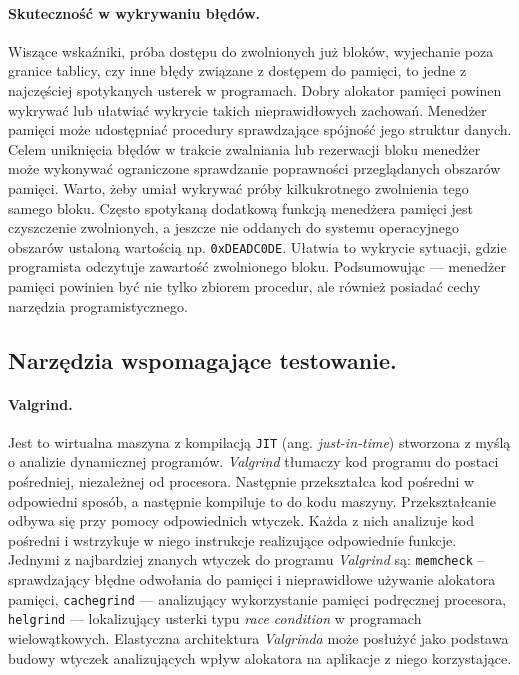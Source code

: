 \documentclass[12pt,a4paper,titlepage,twoside]{mwart}
\begin{document}
\paragraph{Skuteczność w wykrywaniu błędów.} Wiszące wskaźniki, próba dostępu
do zwolnionych już bloków, wyjechanie poza granice tablicy, czy inne błędy
związane z dostępem do pamięci, to jedne z najczęściej spotykanych usterek w
programach. Dobry alokator pamięci powinen wykrywać lub ułatwiać wykrycie
takich nieprawidłowych zachowań. Menedżer pamięci może udostępniać procedury
sprawdzające spójność jego struktur danych. Celem uniknięcia błędów w trakcie
zwalniania lub rezerwacji bloku menedżer może wykonywać ograniczone sprawdzanie
poprawności przeglądanych obszarów pamięci. Warto, żeby umiał wykrywać próby
kilkukrotnego zwolnienia tego samego bloku. Często spotykaną dodatkową funkcją
menedżera pamięci jest czyszczenie zwolnionych, a jeszcze nie oddanych do
systemu operacyjnego obszarów ustaloną wartością np.  \verb+0xDEADC0DE+.
Ułatwia to wykrycie sytuacji, gdzie programista odczytuje zawartość zwolnionego
bloku. Podsumowując --- menedżer pamięci powinien być nie tylko zbiorem
procedur, ale również posiadać cechy narzędzia programistycznego.

\subsection{Narzędzia wspomagające testowanie.}

\paragraph{Valgrind.} Jest to wirtualna maszyna z kompilacją \texttt{JIT} (ang.
\textit{just-in-time}) stworzona z myślą o analizie dynamicznej programów.
\textit{Valgrind} tłumaczy kod programu do postaci pośredniej, niezależnej od
procesora. Następnie przekształca kod pośredni w odpowiedni sposób, a następnie
kompiluje to do kodu maszyny. Przekształcanie odbywa się przy pomocy
odpowiednich wtyczek. Każda z nich analizuje kod pośredni i wstrzykuje w niego
instrukcje realizujące odpowiednie funkcje. Jednymi z najbardziej znanych
wtyczek do programu \textit{Valgrind} są: \texttt{memcheck} -- sprawdzający
błędne odwołania do pamięci i nieprawidłowe używanie alokatora pamięci,
\texttt{cachegrind} --- analizujący wykorzystanie pamięci podręcznej procesora,
\texttt{helgrind} --- lokalizujący usterki typu \textit{race condition} w
programach wielowątkowych. Elastyczna architektura \textit{Valgrinda} może
posłużyć jako podstawa budowy wtyczek analizujących wpływ alokatora na
aplikacje z niego korzystające.
\end{document}
